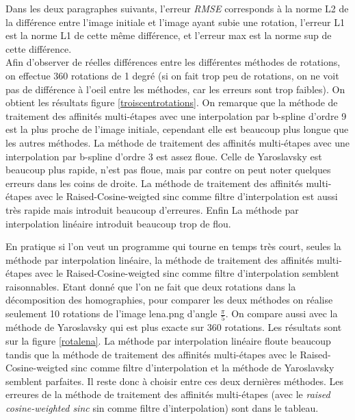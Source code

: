 	Dans les deux paragraphes suivants, l'erreur \emph{RMSE} corresponds à la norme L2 de la différence entre l'image initiale et l'image ayant subie une rotation, l'erreur L1 est la norme L1 de cette même différence, et l'erreur max est la norme sup de cette différence.\\

	Afin d'observer de réelles différences entre les différentes méthodes de rotations, on effectue 360 rotations de 1 degré (si on fait trop peu de rotations, on ne voit pas de différence à l'oeil entre les méthodes, car les erreurs sont trop faibles). On obtient les résultats figure  \ref{troiscentrotations}.  On remarque que la méthode de traitement des affinités multi-étapes avec une interpolation par b-spline d'ordre 9 est la plus proche de l'image initiale, cependant elle est beaucoup plus longue que les autres méthodes.  La méthode de traitement des affinités multi-étapes avec une interpolation par b-spline d'ordre 3 est assez floue. Celle de Yaroslavsky est beaucoup plus rapide, n'est pas floue, mais par contre on peut noter quelques erreurs dans les coins de droite. La méthode de traitement des affinités multi-étapes avec le  Raised-Cosine-weigted sinc comme filtre d'interpolation est aussi très rapide mais introduit beaucoup d'erreures. Enfin La méthode par interpolation linéaire introduit beaucoup trop de flou.\\
\label{pleinsderotations}

	En pratique si l'on veut un programme qui tourne en temps très court, seules la méthode par interpolation linéaire, la méthode de traitement des affinités multi-étapes avec le Raised-Cosine-weigted sinc comme filtre d'interpolation semblent raisonnables. Etant donné que l'on ne fait que deux rotations dans la décomposition des homographies, pour comparer les deux méthodes on réalise seulement 10 rotations de l'image lena.png d'angle $\frac{\pi}{5}$. On compare aussi avec la méthode de Yaroslavsky qui est plus exacte sur 360 rotations. Les résultats sont sur la figure \ref{rotalena}. La méthode par interpolation linéaire floute beaucoup tandis que la méthode de traitement des affinités multi-étapes avec le  Raised-Cosine-weigted sinc comme filtre d'interpolation et la méthode de Yaroslavsky semblent parfaites. Il reste donc à choisir entre ces deux dernières méthodes. Les erreures de la méthode de traitement des affinités multi-étapes (avec le \emph{raised cosine-weighted sinc} sin comme filtre d'interpolation) sont dans le tableau.  \\

